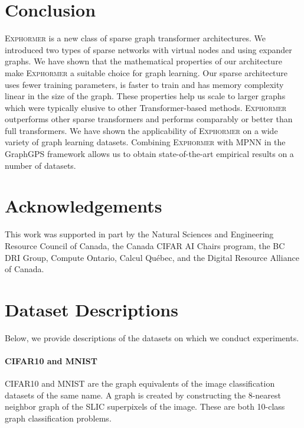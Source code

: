 \documentclass{article}
\theoremstyle{plain}
\theoremstyle{definition}
\theoremstyle{remark}
\begin{document}
\section{Conclusion}

\textsc{Exphormer} is a new class of sparse graph transformer architectures. We introduced two types of sparse networks with virtual nodes and using expander graphs. We have shown that the mathematical properties of our architecture make \textsc{Exphormer} a suitable choice for graph learning. Our sparse architecture uses fewer training parameters, is faster to train and has memory complexity linear in the size of the graph.  These properties help us scale to larger graphs which were typically elusive to other Transformer-based methods. \textsc{Exphormer} outperforms other sparse transformers and performs comparably or better than full transformers. We have shown the applicability of \textsc{Exphormer} on a wide variety of graph learning datasets. Combining \textsc{Exphormer} with MPNN in the GraphGPS framework allows us to obtain state-of-the-art empirical results on a number of datasets. 

\section*{Acknowledgements}
This work was supported in part by the Natural Sciences and Engineering Resource Council of Canada, the Canada CIFAR AI Chairs program, the BC DRI Group, Compute Ontario, Calcul Qu\'ebec, and the Digital Resource Alliance of Canada.





\newpage
\appendix
\onecolumn


\section{Dataset Descriptions} \label{sec:datasetdesc}
Below, we provide descriptions of the datasets on which we conduct experiments.

\paragraph{CIFAR10 and MNIST} \citep{DwivediJLBB20}
CIFAR10 and MNIST are the graph equivalents of the image classification datasets of the same name. A graph is created by constructing the 8-nearest neighbor graph of the SLIC superpixels of the image. These are both 10-class graph classification problems.
\end{document}
